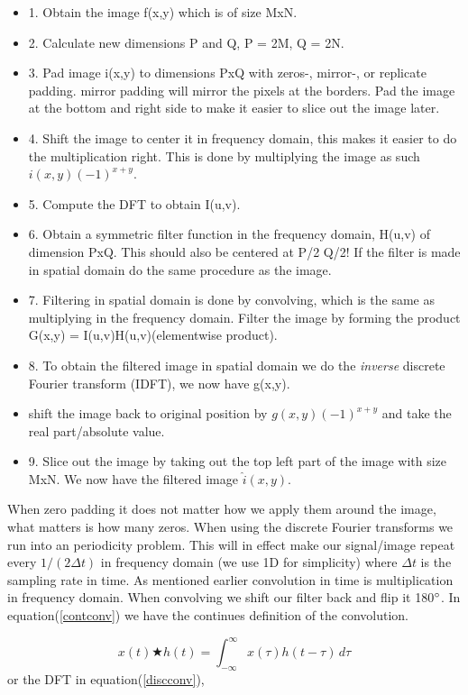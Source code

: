 {\begin{itemize}
    \item 1. Obtain the image f(x,y) which is of size MxN.
    \item 2. Calculate new dimensions P and Q, P = 2M, Q = 2N.
    \item 3. Pad image i(x,y) to dimensions PxQ with zeros-, mirror-, or replicate padding. mirror padding will mirror the pixels at the borders. Pad the image at the bottom and right side to make it easier to slice out the image later.
    \item 4. Shift the image to center it in frequency domain, this makes it easier to do the multiplication right. This is done by multiplying the image as such $i(x,y)(-1)^{x+y}$.
    \item  5. Compute the DFT to obtain I(u,v).
    \item 6. Obtain a symmetric filter function in the frequency domain, H(u,v) of dimension PxQ. This should also be centered at P/2 Q/2! If the filter is made in spatial domain do the same procedure as the image.
    \item 7. Filtering in spatial domain is done by convolving, which is the same as multiplying in the frequency domain. Filter the image by forming the product G(x,y) = I(u,v)H(u,v)(elementwise product).
    \item 8. To obtain the filtered image in spatial domain we do the \emph{inverse} discrete Fourier transform (IDFT), we now have g(x,y).
    \item shift the image back to original position by $g(x,y)(-1)^{x+y}$ and take the real part/absolute value.
    \item 9. Slice out the image by taking out the top left part of the image with size MxN. We now have the filtered image $\hat{i}(x,y)$.
\end{itemize}

When zero padding it does not matter how we apply them around the image, what matters is how many zeros. When using the discrete Fourier transforms we run into an periodicity problem. This will in effect make our signal/image repeat every $1/(2\Delta t)$ in frequency domain (we use 1D for simplicity) where $\Delta t$ is the sampling rate in time. As mentioned earlier convolution in time is multiplication in frequency domain. When convolving we shift our filter back and flip it 180$\degree$. In equation(\ref{contconv}) we have the continues definition of the convolution.

\begin{equation}
    x(t) \bigstar h(t) = \int_{-\infty}^{\infty} x(\tau)h(t - \tau)\, d\tau
    \label{contconv}
\end{equation}
or the DFT in equation(\ref{discconv}),

}
